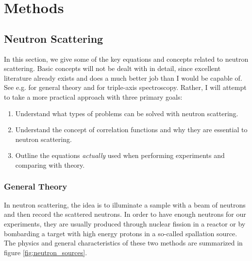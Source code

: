 \newcommand{\jp}{j^\prime}
\newcommand{\jpp}{j^{\prime\prime}}
\newcommand{\lp}{l^\prime}
\newcommand{\lpp}{l^{\prime\prime}}
\newcommand{\fc}{\bm{\Phi}\genfrac{(}{)}{0pt}{}{j \jp}{l \lp}}
\newcommand{\fczero}{\bm{\Phi}\genfrac{(}{)}{0pt}{}{j \jp}{0 \lp}}
\newcommand{\fcb}{\bm{\Theta}\genfrac{(}{)}{0pt}{}{j \jp}{l \lp}}
\newcommand{\fcbpp}{\bm{\Theta}\genfrac{(}{)}{0pt}{}{j \jpp}{l \lpp}}
\newcommand{\fcbf}{-\bm{\Theta}\genfrac{(}{)}{0pt}{}{j \jp}{l \lp} + \delta_{j,\jp} \delta_{l,\lp} \sum_{\jpp, \lpp}  \bm{\Theta}\genfrac{(}{)}{0pt}{}{j \jpp}{l \lpp} }
\newcommand{\rla}[1]{\langle #1 \rangle}
\newcommand*\tageq{\refstepcounter{equation}\tag{\theequation}}

\chapter{Methods}\label{ch:method}

\section{Neutron Scattering}
In this section, we give some of the key equations and concepts related to neutron scattering. Basic concepts will not be dealt with in detail, since excellent literature already exists and does a much better job than I would be capable of. See e.g. \cite{Lovesey1984, Squires2012, Schober2014} for general theory and \cite{Shirane2002} for triple-axis spectroscopy. Rather, I will attempt to take a more practical approach with three primary goals:

\begin{enumerate}
	\item Understand what types of problems can be solved with neutron scattering.
	\item Understand the concept of correlation functions and why they are essential to neutron scattering.
	\item Outline the equations \emph{actually} used when performing experiments and comparing with theory.
\end{enumerate}

\subsection{General Theory}
In neutron scattering, the idea is to illuminate a sample with a beam of neutrons and then record the scattered neutrons. In order to have enough neutrons for our experiments, they are usually produced through nuclear fission in a reactor or by bombarding a target with high energy protons in a so-called spallation source. The physics and general characteristics of these two methods are summarized in figure \ref{fig:neutron_sources}.


